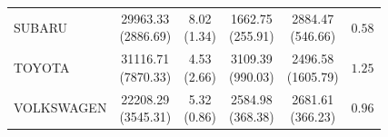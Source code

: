 \begin{tabular}{lccccc}
SUBARU & \makecell{29963.33 \\ (2886.69)\\[0.25em]} & \makecell{8.02 \\ (1.34)\\[0.25em]} & \makecell{1662.75 \\ (255.91)\\[0.25em]} & \makecell{2884.47 \\ (546.66)\\[0.25em]} & $0.58$ \\
TOYOTA & \makecell{31116.71 \\ (7870.33)\\[0.25em]} & \makecell{4.53 \\ (2.66)\\[0.25em]} & \makecell{3109.39 \\ (990.03)\\[0.25em]} & \makecell{2496.58 \\ (1605.79)\\[0.25em]} & $1.25$ \\
VOLKSWAGEN & \makecell{22208.29 \\ (3545.31)\\[0.25em]} & \makecell{5.32 \\ (0.86)\\[0.25em]} & \makecell{2584.98 \\ (368.38)\\[0.25em]} & \makecell{2681.61 \\ (366.23)\\[0.25em]} & $0.96$ \\
\bottomrule
\end{tabular}
